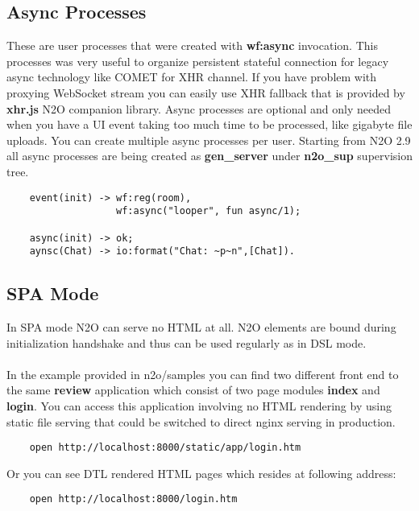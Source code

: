 \subsection{Async Processes}
These are user processes that were created with {\bf wf:async} invocation.
This processes was very useful to organize persistent stateful connection
for legacy async technology like COMET for XHR channel. If you have problem with
proxying WebSocket stream you can easily use XHR fallback that is
provided by {\bf xhr.js} N2O companion library.
Async processes are optional and only needed when you have a UI event taking too much
time to be processed, like gigabyte file uploads. You can create
multiple async processes per user. Starting from N2O 2.9 all async
processes are being created as {\bf gen\_server} under
{\bf n2o\_sup} supervision tree.

\vspace{1\baselineskip}
\begin{lstlisting}
    event(init) -> wf:reg(room),
                   wf:async("looper", fun async/1);

    async(init) -> ok;
    aynsc(Chat) -> io:format("Chat: ~p~n",[Chat]).
\end{lstlisting}
\vspace{1\baselineskip}

\newpage
\subsection{SPA Mode}
In SPA mode N2O can serve no HTML at all. N2O elements are
bound during initialization handshake and thus can be used
regularly as in DSL mode.

\paragraph{}
In the example provided in n2o/samples you can find two different
front end to the same {\bf review} application which consist of
two page modules {\bf index} and {\bf login}. You can access this application
involving no HTML rendering by using static file serving that could be
switched to direct nginx serving in production.

\vspace{1\baselineskip}
\begin{lstlisting}
    open http://localhost:8000/static/app/login.htm
\end{lstlisting}
\vspace{1\baselineskip}

Or you can see DTL rendered HTML pages which resides at following address:

\vspace{1\baselineskip}
\begin{lstlisting}
    open http://localhost:8000/login.htm
\end{lstlisting}
\vspace{1\baselineskip}

